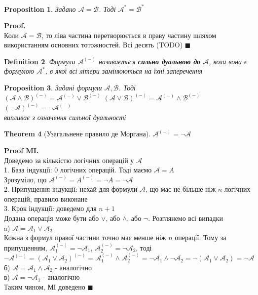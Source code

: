\documentclass[a4paper, 14pt]{extarticle}
\theoremstyle{theoremdd}
\newtheorem{theorem}{Theorem}[subsection]
\theoremstyle{theoremdd}
\newtheorem{definition}[theorem]{Definition}
\theoremstyle{theoremdd}
\theoremstyle{theoremdd}
\theoremstyle{theoremdd}
\theoremstyle{theoremdd}
\theoremstyle{theoremdd}
\theoremstyle{theoremdd}
\theoremstyle{theoremdd}
\newtheorem{proposition}[theorem]{Proposition}
\theoremstyle{theoremdd}
\theoremstyle{theoremdd}
\theoremstyle{theoremdd}
\theoremstyle{theoremdd}
\theoremstyle{theoremdd}
\theoremstyle{theoremdd}
\newenvironment{pf}{\vspace*{-3mm} \textbf{Proof. \\}}{$\blacksquare$}
\newenvironment{pfMI}{\vspace*{-3mm} \textbf{Proof MI. \\}}{$\blacksquare$}
\begin{document}
\begin{proposition}
Задано $\mathcal{A} = \mathcal{B}$. Тоді $\mathcal{A}^* = \mathcal{B}^*$
\end{proposition}

\begin{pf}
Коли $\mathcal{A} = \mathcal{B}$, то ліва частина перетворюється в праву частину шляхом використанням основних тотожностей. Всі десять (TODO) 
\end{pf}

\begin{definition}
Формула $\mathcal{A}^{(-)}$ називається \textbf{сильно дуальною до} $\mathcal{A}$, коли вона є формулою $\mathcal{A}^{*}$, в якої всі літери замінюються на їхні заперечення
\end{definition}

\begin{proposition}
Задані формули $\mathcal{A}, \mathcal{B}$. Тоді\\
$(\mathcal{A} \wedge \mathcal{B})^{(-)} = \mathcal{A}^{(-)} \vee \mathcal{B}^{(-)}$ \hspace{0.5cm} $(\mathcal{A} \vee \mathcal{B})^{(-)} = \mathcal{A}^{(-)} \wedge \mathcal{B}^{(-)}$ \hspace{0.5cm} $(\neg \mathcal{A})^{(-)} = \neg \mathcal{A}^{(-)}$\\
\textit{випливає з означення сильної дуальності}
\end{proposition}

\begin{theorem}[Узагальнене правило де Моргана]
$\mathcal{A}^{(-)} = \neg \mathcal{A}$
\end{theorem}

\begin{pfMI}
Доведемо за кількістю логічних операцій у $\mathcal{A}$\\
1. База індукції: 0 логічних операцій. Тоді маємо $\mathcal{A} = A$\\
Зрозуміло, що $\mathcal{A}^{(-)} = A^{(-)} = \neg A = \neg \mathcal{A}$\\
2. Припущення індукції: нехай для формули $\mathcal{A}$, що має не більше ніж $n$ логічних операцій, правило виконане\\
3. Крок індукції: доведемо для $n+1$\\
Додана операція може бути або $\vee$, або $\wedge$, або $\neg$. Розглянемо всі випадки\\
a) $\mathcal{A} = \mathcal{A}_1 \vee \mathcal{A}_2$\\
Кожна з формул правої частини точно має менше ніж $n$ операції. Тому за припущенням, $\mathcal{A}_1^{(-)} = \neg \mathcal{A}_1$, $\mathcal{A}_2^{(-)} = \neg \mathcal{A}_2$, тоді\\
$\neg \mathcal{A}^{(-)} = (\mathcal{A}_1 \vee \mathcal{A}_2)^{(-)} = \mathcal{A}_1^{(-)} \wedge \mathcal{A}_2^{(-)} = \neg \mathcal{A}_1 \wedge \neg \mathcal{A}_2 = \neg (\mathcal{A}_1 \vee \mathcal{A}_2) = \neg \mathcal{A}$\\
б) $\mathcal{A} = \mathcal{A}_1 \wedge \mathcal{A}_2$ - аналогічно\\
в) $\mathcal{A} = \neg \mathcal{A}_1$ - аналогічно\\
Таким чином, МІ доведено
\end{pfMI}
\end{document}

